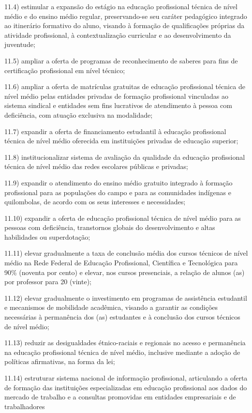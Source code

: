 \documentclass[
]{book}
\begin{document}
11.4) estimular a expansão do estágio na educação profissional técnica de nível médio e do ensino médio regular, preservando-se seu caráter pedagógico integrado ao itinerário formativo do aluno, visando à formação de qualificações próprias da atividade profissional, à contextualização curricular e ao desenvolvimento da juventude;

11.5) ampliar a oferta de programas de reconhecimento de saberes para fins de certificação profissional em nível técnico;

11.6) ampliar a oferta de matrículas gratuitas de educação profissional técnica de nível médio pelas entidades privadas de formação profissional vinculadas ao sistema sindical e entidades sem fins lucrativos de atendimento à pessoa com deficiência, com atuação exclusiva na modalidade;

11.7) expandir a oferta de financiamento estudantil à educação profissional técnica de nível médio oferecida em instituições privadas de educação superior;

11.8) institucionalizar sistema de avaliação da qualidade da educação profissional técnica de nível médio das redes escolares públicas e privadas;

11.9) expandir o atendimento do ensino médio gratuito integrado à formação profissional para as populações do campo e para as comunidades indígenas e quilombolas, de acordo com os seus interesses e necessidades;

11.10) expandir a oferta de educação profissional técnica de nível médio para as pessoas com deficiência, transtornos globais do desenvolvimento e altas habilidades ou superdotação;

11.11) elevar gradualmente a taxa de conclusão média dos cursos técnicos de nível médio na Rede Federal de Educação Profissional, Científica e Tecnológica para 90\% (noventa por cento) e elevar, nos cursos presenciais, a relação de alunos (as) por professor para 20 (vinte);

11.12) elevar gradualmente o investimento em programas de assistência estudantil e mecanismos de mobilidade acadêmica, visando a garantir as condições necessárias à permanência dos (as) estudantes e à conclusão dos cursos técnicos de nível médio;

11.13) reduzir as desigualdades étnico-raciais e regionais no acesso e permanência na educação profissional técnica de nível médio, inclusive mediante a adoção de políticas afirmativas, na forma da lei;

11.14) estruturar sistema nacional de informação profissional, articulando a oferta de formação das instituições especializadas em educação profissional aos dados do mercado de trabalho e a consultas promovidas em entidades empresariais e de trabalhadores
\end{document}
